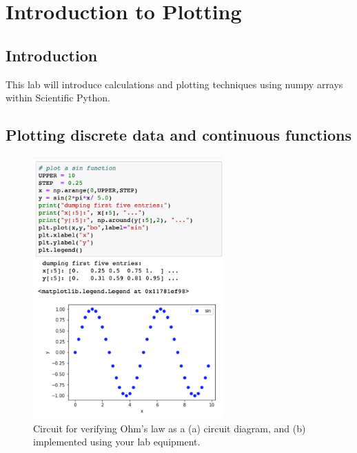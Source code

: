 \chapter{Introduction to Plotting}

\section{Introduction}
This lab will introduce calculations and plotting techniques using numpy arrays within Scientific Python.

\section{Plotting discrete data and continuous functions}

\begin{figure}[htbp]
\begin{center}
\includegraphics[width=0.65\textwidth]{figs/python/plotting/plotting.png} 
\caption{Circuit for verifying Ohm's law as a (a) circuit diagram, and (b) implemented using your lab equipment.}
\label{fig:plotsin}
\end{center}
\end{figure}

